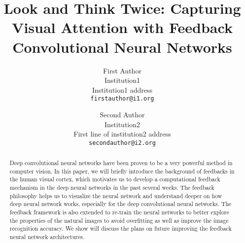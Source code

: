 \documentclass[10pt,twocolumn,letterpaper]{article}
\begin{document}
\title{Look and Think Twice: Capturing Visual Attention with Feedback Convolutional Neural Networks}

\author{First Author\\
Institution1\\
Institution1 address\\
{\tt\small firstauthor@i1.org}
\and
Second Author\\
Institution2\\
First line of institution2 address\\
{\tt\small secondauthor@i2.org}
}

\maketitle


\begin{abstract}
Deep convolutional neural networks have been proven to be a very powerful method in computer vision. In this paper, we will briefly introduce the background of feedbacks in the human visual cortex, which motivates us to develop a computational feedback mechanism in the deep neural networks in the past several weeks. The feedback philosophy helps us to visualize the neural network and understand deeper on how deep neural network works, especially for the deep convolutional neural networks. The feedback framework is also extended to re-train the neural networks to better explore the properties of the natural images to avoid overfitting as well as improve the image recognition accuracy. We show will discuss the plans on future improving the feedback neural network architectures.
\end{abstract}







{\small


}
\end{document}
